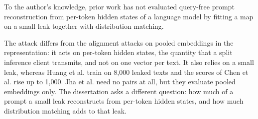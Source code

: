 To the author's knowledge, prior work has not evaluated query-free prompt reconstruction from per-token hidden states of a language model by fitting a map on a small leak together with distribution matching.

The attack differs from the alignment attacks on pooled embeddings in the representation: it acts on per-token hidden states, the quantity that a split inference client transmits, and not on one vector per text.
It also relies on a small leak, whereas Huang et al. train on 8,000 leaked texts and the scores of Chen et al. rise up to 1,000.
Jha et al. need no pairs at all, but they evaluate pooled embeddings only.
The dissertation asks a different question: how much of a prompt a small leak reconstructs from per-token hidden states, and how much distribution matching adds to that leak.
